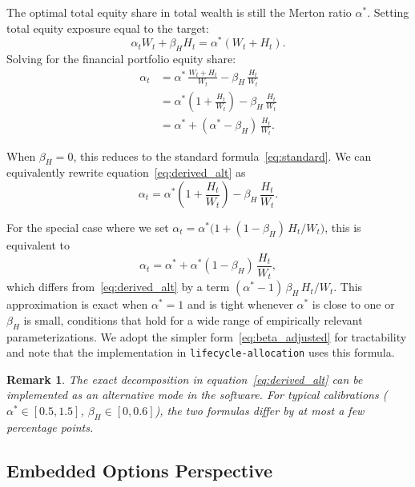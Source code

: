 \documentclass[11pt]{article}
\newtheorem{remark}{Remark}
\begin{document}
The optimal total equity share in total wealth is still the Merton ratio
$\alpha^{*}$. Setting total equity exposure equal to the target:
\begin{equation}
  \alpha_t W_t + \beta_H H_t = \alpha^{*}(W_t + H_t).
\end{equation}
Solving for the financial portfolio equity share:
\begin{align}
  \alpha_t &= \alpha^{*}\,\frac{W_t + H_t}{W_t} - \beta_H\,\frac{H_t}{W_t} \nonumber\\
           &= \alpha^{*}\!\left(1 + \frac{H_t}{W_t}\right) - \beta_H\,\frac{H_t}{W_t} \nonumber\\
           &= \alpha^{*} + (\alpha^{*} - \beta_H)\,\frac{H_t}{W_t}. \label{eq:derived_alt}
\end{align}

When $\beta_H = 0$, this reduces to the standard formula~\eqref{eq:standard}.
We can equivalently rewrite equation~\eqref{eq:derived_alt} as
\begin{equation}
  \alpha_t = \alpha^{*}\!\left(1 + \frac{H_t}{W_t}\right) - \beta_H\,\frac{H_t}{W_t}.
\end{equation}

For the special case where we set
$\alpha_t = \alpha^{*}\!\bigl(1 + (1-\beta_H)\,H_t/W_t\bigr)$, this is
equivalent to
\begin{equation}
  \alpha_t = \alpha^{*} + \alpha^{*}(1-\beta_H)\,\frac{H_t}{W_t},
\end{equation}
which differs from~\eqref{eq:derived_alt} by a term
$(\alpha^{*} - 1)\,\beta_H\,H_t/W_t$. This approximation is exact when
$\alpha^{*} = 1$ and is tight whenever $\alpha^{*}$ is close to one or
$\beta_H$ is small, conditions that hold for a wide range of empirically
relevant parameterizations. We adopt the simpler
form~\eqref{eq:beta_adjusted} for tractability and note that the
implementation in \texttt{lifecycle-allocation} uses this formula.

\begin{remark}\label{rem:exact}
The exact decomposition in equation~\eqref{eq:derived_alt} can be
implemented as an alternative mode in the software. For typical
calibrations ($\alpha^{*} \in [0.5, 1.5]$, $\beta_H \in [0, 0.6]$),
the two formulas differ by at most a few percentage points.
\end{remark}

\subsection{Embedded Options Perspective}\label{sec:options}
\end{document}
